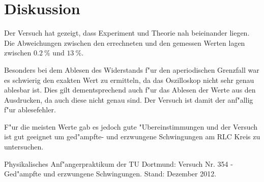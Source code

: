 \newpage
\section{Diskussion}
	\label{sec:diskussion}

	Der Versuch hat gezeigt, dass Experiment und Theorie nah beieinander liegen.
	Die Abweichungen zwischen den errechneten und den gemessen Werten lagen zwischen $\SI{0.2}{\%}$ und $\SI{13}{\%}$.

	Besonders bei dem Ablesen des Widerstands f"ur den aperiodischen Grenzfall war es schwierig den exakten Wert zu ermitteln, da das Oszilloskop nicht sehr genau ablesbar ist.
	Dies gilt dementsprechend auch f"ur das Ablesen der Werte aus den Ausdrucken, da auch diese nicht genau sind.
	Der Versuch ist damit der anf"allig f"ur ablesefehler.

	F"ur die meisten Werte gab es jedoch gute "Ubereinstimmungen und der Versuch ist gut geeignet um ged"ampfte- und erzwungene Schwingungen am RLC Kreis zu untersuchen.

	\begin{thebibliography}{9}
	\label{sec:literaturverzeichnis}
		 Physikalisches Anf"angerpraktikum der TU Dortmund: Versuch Nr. 354 - Ged"ampfte und erzwungene Schwingungen. Stand: Dezember 2012.
	\end{thebibliography}
